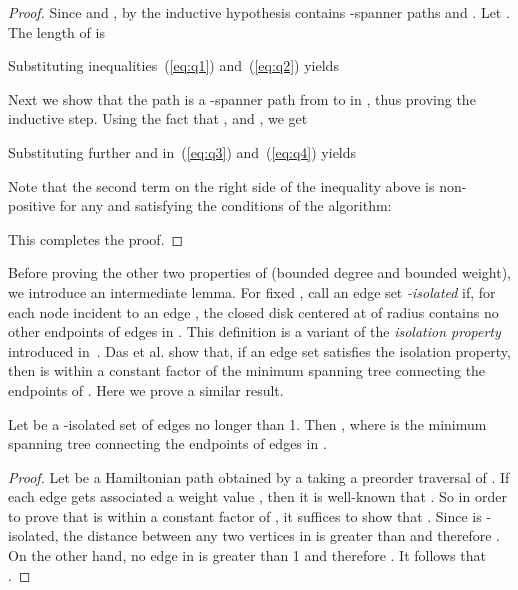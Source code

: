 \documentclass{llncs}
\newcommand{\ABox}{
\raisebox{3pt}{\framebox[6pt]{\rule{6pt}{0pt}}}
}
\begin{document}
\begin{proof}
Since  and , by the inductive
hypothesis  contains -spanner paths  and .
Let .
The length of  is

Substituting inequalities~(\ref{eq:q1}) and~(\ref{eq:q2}) yields

Next we show that the path  is a -spanner path from  to  in , thus proving the inductive step. Using the fact that ,  and , we get

Substituting further  and  in~(\ref{eq:q3}) and~(\ref{eq:q4}) yields

Note that the second term on the right side of the inequality above is
non-positive for any  and  satisfying the conditions of the algorithm:

This completes the proof. \hfill\ABox
\end{proof}

Before proving the other two properties of  (bounded degree and bounded weight), we
introduce an intermediate lemma. For fixed , call an edge set
 \emph{-isolated} if,
for each node  incident to an edge , the closed disk  centered at
 of radius  contains no other endpoints of edges in . This definition is a
variant of the \emph{isolation property} introduced in~\cite{Das95}. Das et al. show
that, if an edge set  satisfies the isolation property, then  is within a
constant factor of the minimum spanning tree connecting the endpoints of . Here we
prove a similar result.

\begin{lemma}
Let  be a -isolated set of edges no longer than 1.
Then , where  is the
minimum spanning tree connecting the endpoints of edges in .
\label{lem:isolated}
\end{lemma}
\begin{proof}
Let  be a Hamiltonian path obtained by a taking a preorder traversal of .
If each edge  gets associated a weight value ,
then it is well-known that . So in order to prove that 
is within a constant factor of , it suffices to show that .
Since  is -isolated, the distance between any two vertices in  is greater
than  and therefore .
On the other hand, no edge in  is greater than 1 and therefore
. It follows that . \hfill\ABox
\end{proof}
\end{document}
